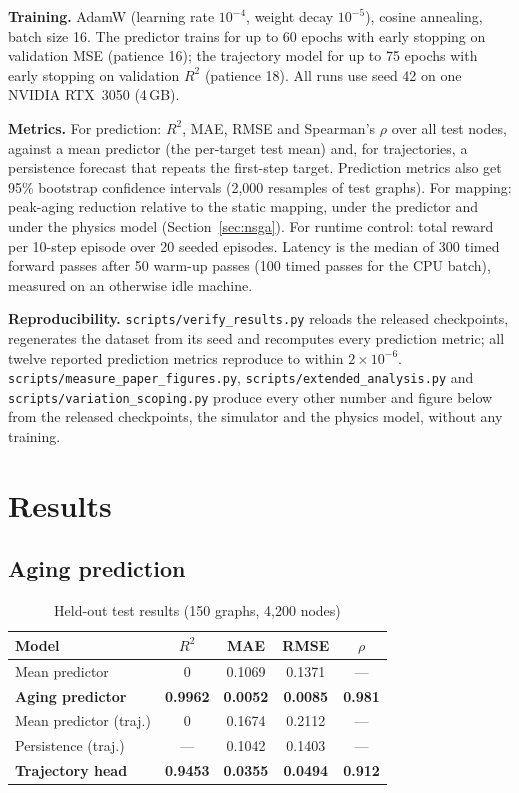 \documentclass[conference]{IEEEtran}
\begin{document}
\textbf{Training.} AdamW (learning rate $10^{-4}$, weight decay $10^{-5}$), cosine annealing, batch size 16. The predictor trains for up to 60 epochs with early stopping on validation MSE (patience 16); the trajectory model for up to 75 epochs with early stopping on validation $R^2$ (patience 18). All runs use seed 42 on one NVIDIA RTX~3050 (4\,GB).

\textbf{Metrics.} For prediction: $R^2$, MAE, RMSE and Spearman's $\rho$ over all test nodes, against a mean predictor (the per-target test mean) and, for trajectories, a persistence forecast that repeats the first-step target. Prediction metrics also get 95\% bootstrap confidence intervals (2{,}000 resamples of test graphs). For mapping: peak-aging reduction relative to the static mapping, under the predictor and under the physics model (Section~\ref{sec:nsga}). For runtime control: total reward per 10-step episode over 20 seeded episodes. Latency is the median of 300 timed forward passes after 50 warm-up passes (100 timed passes for the CPU batch), measured on an otherwise idle machine.

\textbf{Reproducibility.} \texttt{scripts/verify\_results.py} reloads the released checkpoints, regenerates the dataset from its seed and recomputes every prediction metric; all twelve reported prediction metrics reproduce to within $2\times 10^{-6}$. \texttt{scripts/measure\_paper\_figures.py}, \texttt{scripts/extended\_analysis.py} and \texttt{scripts/variation\_scoping.py} produce every other number and figure below from the released checkpoints, the simulator and the physics model, without any training.

\section{Results}
\label{sec:results}

\subsection{Aging prediction}

\begin{table}[t]
    \centering
    \caption{Held-out test results (150 graphs, 4{,}200 nodes)}
    \label{tab:prediction}
    \begin{tabular}{lcccc}
        \toprule
        \textbf{Model} & \textbf{$R^2$} & \textbf{MAE} & \textbf{RMSE} & \textbf{$\rho$} \\
        \midrule
        Mean predictor & 0 & 0.1069 & 0.1371 & --- \\
        \textbf{Aging predictor} & \textbf{0.9962} & \textbf{0.0052} & \textbf{0.0085} & \textbf{0.981} \\
        \midrule
        Mean predictor (traj.) & 0 & 0.1674 & 0.2112 & --- \\
        Persistence (traj.) & --- & 0.1042 & 0.1403 & --- \\
        \textbf{Trajectory head} & \textbf{0.9453} & \textbf{0.0355} & \textbf{0.0494} & \textbf{0.912} \\
        \bottomrule
    \end{tabular}
\end{table}
\end{document}
